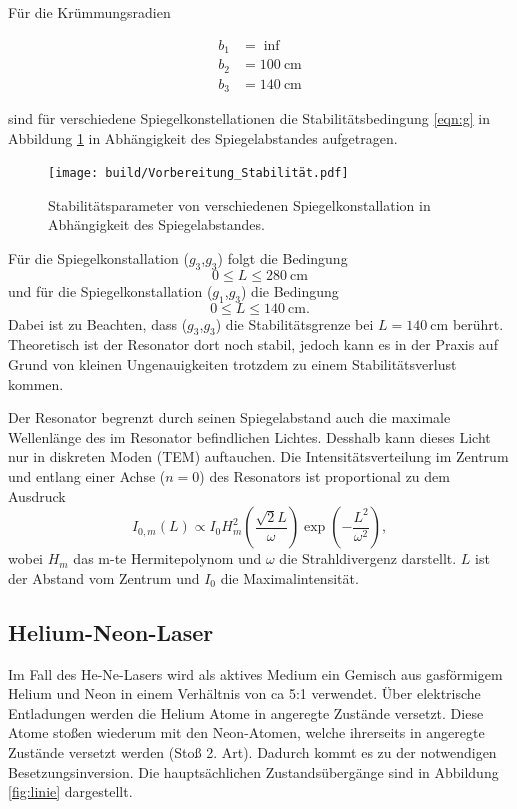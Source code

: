 Für die Krümmungsradien

\begin{align*}
    b_1 & = \inf \\
    b_2 & = \SI{100}{\centi\m} \\
    b_3 & = \SI{140}{\centi\m}
\end{align*}

sind für verschiedene Spiegelkonstellationen die Stabilitätsbedingung \eqref{eqn:g} in Abbildung \ref{fig:vor} in Abhängigkeit des Spiegelabstandes aufgetragen.

\begin{figure}
    \centering
    \texttt{[image: build/Vorbereitung\_Stabilität.pdf]}
    \caption{Stabilitätsparameter von verschiedenen Spiegelkonstallation in Abhängigkeit des Spiegelabstandes.}
    \label{fig:vor}
\end{figure}

Für die Spiegelkonstallation ($g_3$,$g_3$) folgt die Bedingung
\begin{equation}
    0 \leq L \leq \SI{280}{\cm}
\end{equation}
und für die Spiegelkonstallation ($g_1$,$g_3$) die Bedingung
\begin{equation}
    0 \leq L \leq \SI{140}{\cm}.
\end{equation}
Dabei ist zu Beachten, dass ($g_3$,$g_3$) die Stabilitätsgrenze bei $L = \SI{140}{\cm}$ berührt. Theoretisch ist der Resonator dort noch stabil, jedoch kann es in der Praxis auf Grund von kleinen Ungenauigkeiten trotzdem zu einem Stabilitätsverlust kommen.


\subject{Moden im Resonator}

Der Resonator begrenzt durch seinen Spiegelabstand auch die maximale Wellenlänge des im Resonator befindlichen Lichtes. Desshalb kann dieses Licht nur in diskreten Moden (TEM) auftauchen. 
Die Intensitätsverteilung im Zentrum und entlang einer Achse ($n=0$) des Resonators ist proportional zu dem Ausdruck 
\begin{equation}
    \label{eqn:mode}
    I_{0,m}(L) \propto I_0 H_m^2\left(\frac{\sqrt{2}L}{\omega}\right)\exp{\left(-\frac{L^2}{\omega^2}\right)},
\end{equation}
wobei $H_m$ das m-te Hermitepolynom und $\omega$ die Strahldivergenz darstellt. $L$ ist der Abstand vom Zentrum und $I_0$ die Maximalintensität.

\subsection{Helium-Neon-Laser}
Im Fall des He-Ne-Lasers wird als aktives Medium ein Gemisch aus gasförmigem Helium und Neon in einem Verhältnis von ca 5:1 verwendet.
Über elektrische Entladungen werden die Helium Atome in angeregte Zustände versetzt. Diese Atome stoßen wiederum mit den Neon-Atomen, welche ihrerseits in angeregte Zustände versetzt werden (Stoß 2. Art). Dadurch kommt es zu der notwendigen Besetzungsinversion. Die hauptsächlichen Zustandsübergänge sind in Abbildung \ref{fig:linie} dargestellt.

